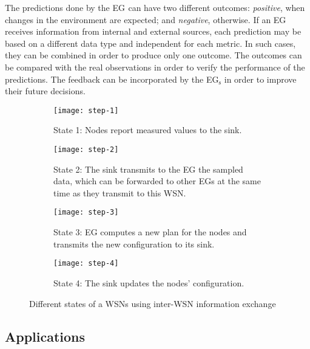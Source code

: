 \documentclass{llncs}
\newcommand{\EG}[1]{EG$_{\text{#1}}$}
\begin{document}
The predictions done by the \EG{} can have two different outcomes: 
\emph{positive}, when changes in the environment are expected; and 
\emph{negative}, otherwise.
If an \EG{} receives information from internal and external sources, each 
prediction may be based on a different data type and independent for each 
metric. In such cases, they can be combined in order to produce only one 
outcome.
The outcomes can be compared with the real observations in order to verify the 
performance of the predictions. 
The feedback can be incorporated by the \EG{s} in order to improve their 
future decisions.

\begin{figure}[h]
        \centering
        \begin{subfigure}[t]{0.21\textwidth}
                \centering
                \texttt{[image: step-1]}
                \caption{State 1: Nodes report measured values to the sink.}
                \label{fig:step-1}
        \end{subfigure}\qquad
        \begin{subfigure}[t]{0.21\textwidth}
                \centering
                \texttt{[image: step-2]}
                \caption{State 2: The sink transmits to the EG the sampled 
data, which 
                         can be forwarded to other EGs at the same time as they 
                         transmit to this WSN.}
                \label{fig:step-2}
        \end{subfigure}\qquad
        \begin{subfigure}[t]{0.21\textwidth}
                \centering
                \texttt{[image: step-3]}
                \caption{State 3: EG computes a new plan for the nodes and 
transmits the 
                         new configuration to its sink.}
                \label{fig:step-3}
        \end{subfigure}\qquad
        \begin{subfigure}[t]{0.21\textwidth}
                \centering
                \texttt{[image: step-4]}
                \caption{State 4: The sink updates the nodes' configuration.}
                \label{fig:step-4}
        \end{subfigure}\caption{Different states of a WSNs using inter-WSN information 
exchange}
        \label{fig:steps}
\end{figure}




\subsection{Applications}
\label{section:approaches}
\end{document}
